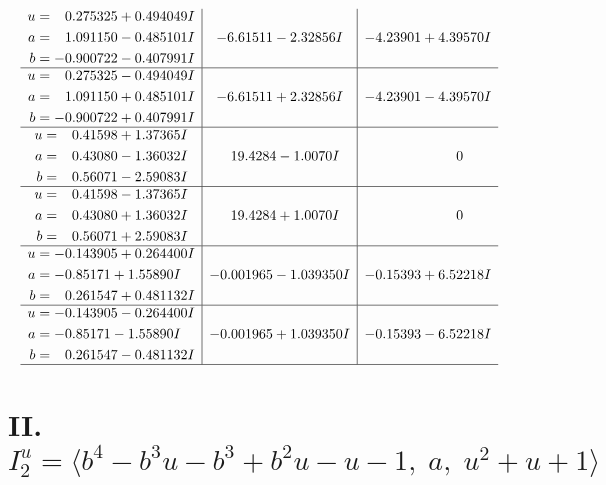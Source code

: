 \documentclass[1p]{elsarticle_modified}
\theoremstyle{definition}
\begin{document}
$$\begin{array}{c|c|c}
\begin{aligned}
u &= \phantom{-}0.275325 + 0.494049 I \\
a &= \phantom{-}1.091150 - 0.485101 I \\
b &= -0.900722 - 0.407991 I\end{aligned}
 & -6.61511 - 2.32856 I & -4.23901 + 4.39570 I \\ \hline\begin{aligned}
u &= \phantom{-}0.275325 - 0.494049 I \\
a &= \phantom{-}1.091150 + 0.485101 I \\
b &= -0.900722 + 0.407991 I\end{aligned}
 & -6.61511 + 2.32856 I & -4.23901 - 4.39570 I \\ \hline\begin{aligned}
u &= \phantom{-}0.41598 + 1.37365 I \\
a &= \phantom{-}0.43080 - 1.36032 I \\
b &= \phantom{-}0.56071 - 2.59083 I\end{aligned}
 & \phantom{-}19.4284 - 1.0070 I & \phantom{-0.000000 } 0 \\ \hline\begin{aligned}
u &= \phantom{-}0.41598 - 1.37365 I \\
a &= \phantom{-}0.43080 + 1.36032 I \\
b &= \phantom{-}0.56071 + 2.59083 I\end{aligned}
 & \phantom{-}19.4284 + 1.0070 I & \phantom{-0.000000 } 0 \\ \hline\begin{aligned}
u &= -0.143905 + 0.264400 I \\
a &= -0.85171 + 1.55890 I \\
b &= \phantom{-}0.261547 + 0.481132 I\end{aligned}
 & -0.001965 - 1.039350 I & -0.15393 + 6.52218 I \\ \hline\begin{aligned}
u &= -0.143905 - 0.264400 I \\
a &= -0.85171 - 1.55890 I \\
b &= \phantom{-}0.261547 - 0.481132 I\end{aligned}
 & -0.001965 + 1.039350 I & -0.15393 - 6.52218 I\\
 \hline 
 \end{array}$$\newpage\newpage\renewcommand{\arraystretch}{1}
\centering \section*{II. $I^u_{2}= \langle b^4- b^3 u- b^3+b^2 u- u-1,\;a,\;u^2+u+1 \rangle$}
\end{document}

